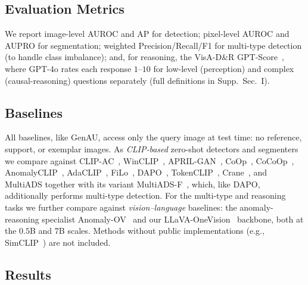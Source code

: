 \subsection{Evaluation Metrics}
We report image-level AUROC and AP for detection; pixel-level AUROC and AUPRO for segmentation; weighted Precision/Recall/F1 for multi-type detection (to handle class imbalance); and, for reasoning, the VisA-D\&R GPT-Score~\cite{xu2025towards}, where GPT-4o rates each response $1$--$10$ for low-level (perception) and complex (causal-reasoning) questions separately (full definitions in Supp.~Sec.~I).

\subsection{Baselines}
All baselines, like GenAU, access only the query image at test time: no reference, support, or exemplar images. As \emph{CLIP-based} zero-shot detectors and segmenters we compare against CLIP-AC~\cite{radford2021}, WinCLIP~\cite{jeong2023winclip}, APRIL-GAN~\cite{chen2023zero}, CoOp~\cite{CoOp}, CoCoOp~\cite{zhou2022conditionalpromptlearningvisionlanguage}, AnomalyCLIP~\cite{zhou2024anomalyclip}, AdaCLIP~\cite{Cao_2024}, FiLo~\cite{gu2024filozeroshotanomalydetection}, DAPO~\cite{nazer2025dapo}, TokenCLIP~\cite{zhou2026tokenclip}, Crane~\cite{salehi2026crane}, and MultiADS together with its variant MultiADS-F~\cite{sadikaj2025multiadsdefectawaresupervisionmultitype}, which, like DAPO, additionally performs multi-type detection. For the multi-type and reasoning tasks we further compare against \emph{vision--language} baselines: the anomaly-reasoning specialist Anomaly-OV~\cite{xu2025towards} and our LLaVA-OneVision~\cite{li2025llavaonevision} backbone, both at the $0.5$B and $7$B scales. Methods without public implementations (e.g., SimCLIP~\cite{simclip}) are not included.

\subsection{Results}

